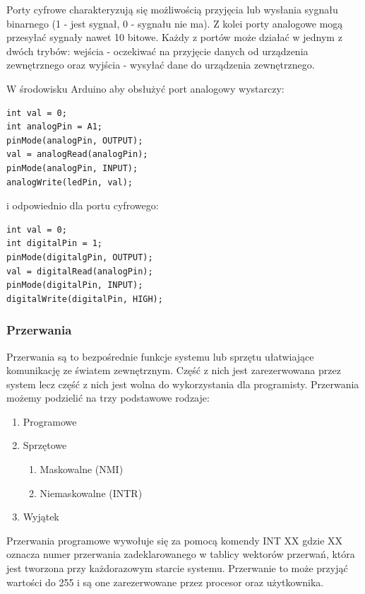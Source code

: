 \documentclass{xmgr}
\begin{document}
Porty cyfrowe charakteryzują się możliwością przyjęcia lub wysłania sygnału binarnego (1 - jest sygnał, 0 - sygnału nie ma). Z kolei porty analogowe mogą przesyłać sygnały nawet 10 bitowe. Każdy z portów może działać w jednym  z dwóch trybów: wejścia - oczekiwać na przyjęcie danych od urządzenia zewnętrznego oraz wyjścia - wysyłać dane do urządzenia zewnętrznego. 


W środowisku Arduino aby obsłużyć port analogowy wystarczy:
\begin{lstlisting}[label=bot-dirs-alg,caption=Obsługa portu analogowego w środowisku Arduino]
int val = 0;
int analogPin = A1;	
pinMode(analogPin, OUTPUT);
val = analogRead(analogPin);
pinMode(analogPin, INPUT);
analogWrite(ledPin, val);
\end{lstlisting}

i odpowiednio dla portu cyfrowego:
\begin{lstlisting}[label=bot-dirs-alg,caption=Obsługa portu cyfrowego w środowisku Arduino]
int val = 0;
int digitalPin = 1;	
pinMode(digitalgPin, OUTPUT);
val = digitalRead(analogPin);
pinMode(digitalPin, INPUT);
digitalWrite(digitalPin, HIGH);
\end{lstlisting}

\subsubsection{Przerwania}

Przerwania są to bezpośrednie funkcje systemu lub sprzętu ułatwiające komunikację ze światem zewnętrznym. Część z nich jest zarezerwowana przez system lecz część z nich jest wolna do wykorzystania dla programisty. Przerwania możemy podzielić na trzy podstawowe rodzaje:

\begin{enumerate}
	\item Programowe
	\item Sprzętowe
	\begin{enumerate}
		\item Maskowalne (NMI)
		\item Niemaskowalne (INTR)
	\end{enumerate}
	\item Wyjątek
\end{enumerate}

Przerwania programowe wywołuje się za pomocą komendy INT XX gdzie XX oznacza numer przerwania zadeklarowanego w tablicy wektorów przerwań, która jest tworzona przy każdorazowym starcie systemu. Przerwanie to może przyjąć wartości do 255 i są one zarezerwowane przez procesor oraz użytkownika.
\end{document}
